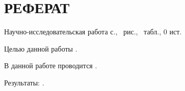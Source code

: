 \section*{\large РЕФЕРАТ}

Научно-исследовательская работа \pageref{LastPage} с., \totalfigures\ рис., \totaltables\ табл., 0 ист.


Целью данной работы .

В данной работе проводится .

Результаты: .


\pagebreak